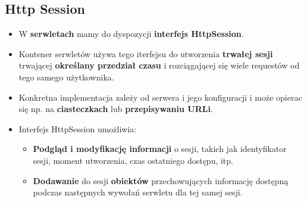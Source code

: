 \documentclass[../main.tex]{subfiles}
\begin{document}
    \subsection{Http Session}
    \begin{itemize}
        \item W \textbf{serwletach} mamy do dyspozycji \textbf{interfejs HttpSession}.
        \item Kontener serwletów używa tego iterfejsu do utworzenia \textbf{trwałej sesji} trwającej \textbf{określany przedział czasu} i rozciągającej się wiele requestów od tego samego użytkownika.
        \item Konkretna implementacja zależy od serwera i jego konfiguracji i może opierac się np. na \textbf{ciasteczkach} lub \textbf{przepisywaniu URLi}.
        \item Interfejs HttpSession umożliwia:
        \begin{itemize}
            \item \textbf{Podgląd i modyfikację informacji} o sesji, takich jak identyfikator sesji, moment utworzenia, czas ostatniego dostępu, itp.
            \item \textbf{Dodawanie} do sesji \textbf{obiektów} przechowujących informację dostępną
            podczas następnych wywołań serwletu dla tej samej sesji.
        \end{itemize}
    \end{itemize}
\end{document}
